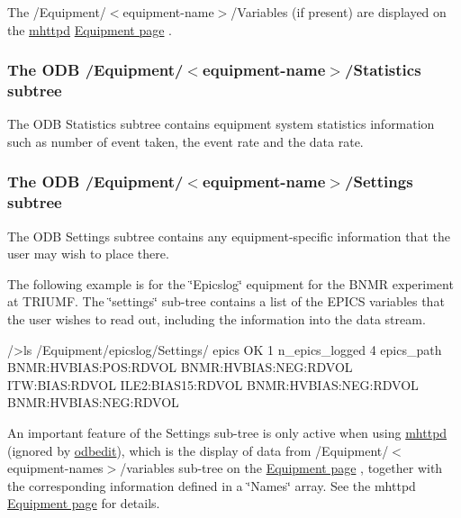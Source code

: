 The /Equipment/$<$equipment-\/name$>$/Variables (if present) are displayed on the \hyperlink{RC_mhttpd_utility}{mhttpd} \hyperlink{RC_mhttpd_Equipment_page}{Equipment page} .\hypertarget{FE_ODB_equipment_tree_FE_ODB_equipment_statistics}{}\subsubsection{The ODB /Equipment/$<$equipment-\/name$>$/Statistics subtree}\label{FE_ODB_equipment_tree_FE_ODB_equipment_statistics}
The ODB Statistics subtree contains equipment system statistics information such as number of event taken, the event rate and the data rate.\hypertarget{FE_ODB_equipment_tree_FE_ODB_equipment_settings}{}\subsubsection{The ODB /Equipment/$<$equipment-\/name$>$/Settings subtree}\label{FE_ODB_equipment_tree_FE_ODB_equipment_settings}
The ODB Settings subtree contains any equipment-\/specific information that the user may wish to place there. \par
 The following example is for the \char`\"{}Epicslog\char`\"{} equipment for the BNMR experiment at TRIUMF. The \char`\"{}settings\char`\"{} sub-\/tree contains a list of the EPICS variables that the user wishes to read out, including the information into the data stream.


\begin{DoxyCode}
/>ls /Equipment/epicslog/Settings/
epics OK                        1
n_epics_logged                  4
epics_path
                                BNMR:HVBIAS:POS:RDVOL
                                BNMR:HVBIAS:NEG:RDVOL
                                ITW:BIAS:RDVOL
                                ILE2:BIAS15:RDVOL
                                BNMR:HVBIAS:NEG:RDVOL
                                BNMR:HVBIAS:NEG:RDVOL
\end{DoxyCode}


An important feature of the Settings sub-\/tree is only active when using \hyperlink{RC_mhttpd_utility}{mhttpd} (ignored by \hyperlink{RC_odbedit_utility}{odbedit}), which is the display of data from /Equipment/$<$equipment-\/names$>$/variables sub-\/tree on the \hyperlink{RC_mhttpd_Equipment_page}{Equipment page} , together with the corresponding information defined in a \char`\"{}Names\char`\"{} array. See the mhttpd \hyperlink{RC_mhttpd_Equipment_page}{Equipment page} for details.

